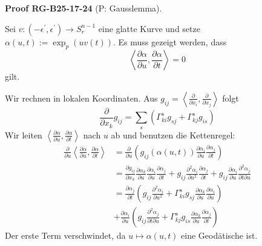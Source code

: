 \documentclass[10pt, letterpaper]{article}
\newcommand{\CustomHeading}[3]{%
  \par\medskip\noindent%
  \textbf{#1 #2} \textnormal{(#3)}.\enskip%
}
\newenvironment{PROOF}[2]{\begin{unitbox}\CustomHeading{Proof}{#1}{#2}}{\end{unitbox}}
\begin{document}
\begin{PROOF}{RG-B25-17-24}{P: Gausslemma}
Sei $v:\left(-\epsilon^{\prime}, \epsilon^{\prime}\right) \rightarrow S_{r}^{n-1}$ eine glatte Kurve und setze $\alpha(u, t):=\exp _{p}(u v(t))$. Es muss gezeigt werden, dass
$$
\left\langle\frac{\partial \alpha}{\partial u}, \frac{\partial \alpha}{\partial t}\right\rangle=0
$$
gilt.

Wir rechnen in lokalen Koordinaten. Aus $g_{i j}=\left\langle\frac{\partial}{\partial x_{i}}, \frac{\partial}{\partial x_{j}}\right\rangle$ folgt
$$
\frac{\partial}{\partial x_{k}} g_{i j}=\sum_{s}\left(\Gamma_{k i}^{s} g_{s j}+\Gamma_{k j}^{s} g_{i s}\right)
$$
Wir leiten $\left\langle\frac{\partial \alpha}{\partial u}, \frac{\partial \alpha}{\partial t}\right\rangle$ nach $u$ ab und benutzen die Kettenregel:
$$
\begin{aligned}
\frac{\partial}{\partial u}\left\langle\frac{\partial \alpha}{\partial u}, \frac{\partial \alpha}{\partial t}\right\rangle & =\frac{\partial}{\partial u}\left(g_{i j}(\alpha(u, t)) \frac{\partial \alpha_{i}}{\partial u} \frac{\partial \alpha_{j}}{\partial t}\right) \\
& =\frac{\partial g_{i j}}{\partial x_{k}} \frac{\partial \alpha_{k}}{\partial u} \frac{\partial \alpha_{i}}{\partial u} \frac{\partial \alpha_{j}}{\partial t}+g_{i j} \frac{\partial^{2} \alpha_{i}}{\partial u^{2}} \frac{\partial \alpha_{j}}{\partial t}+g_{i j} \frac{\partial \alpha_{i}}{\partial u} \frac{\partial^{2} \alpha_{j}}{\partial t \partial u} \\
& =\frac{\partial \alpha_{j}}{\partial t}\left(g_{i j} \frac{\partial^{2} \alpha_{i}}{\partial u^{2}}+\Gamma_{k i}^{s} g_{s j} \frac{\partial \alpha_{k}}{\partial u} \frac{\partial \alpha_{i}}{\partial u}\right) \\
& +\frac{\partial \alpha_{i}}{\partial u}\left(g_{i j} \frac{\partial^{2} \alpha_{j}}{\partial t \partial u}+\Gamma_{k j}^{s} g_{i s} \frac{\partial \alpha_{k}}{\partial u} \frac{\partial \alpha_{j}}{\partial t}\right)
\end{aligned}
$$
Der erste Term verschwindet, da $u \mapsto \alpha(u, t)$ eine Geodätische ist.


\end{PROOF}
\end{document}
